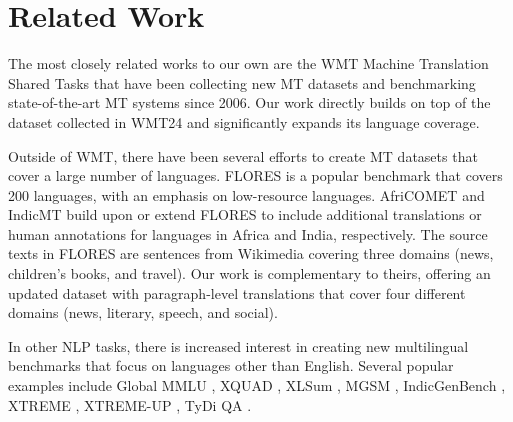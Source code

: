 \section{Related Work}
The most closely related works to our own are the WMT Machine Translation Shared Tasks \citep[][\emph{inter alia}]{kocmi-etal-2024-findings} that have been collecting new MT datasets and benchmarking state-of-the-art MT systems since 2006.
Our work directly builds on top of the dataset collected in WMT24 and significantly expands its language coverage.

Outside of WMT, there have been several efforts to create MT datasets that cover a large number of languages.
FLORES \citep{flores101,nllb2022} is a popular benchmark that covers 200 languages, with an emphasis on low-resource languages.
AfriCOMET \citep{wang-etal-2024-afrimte} and IndicMT \citep{sai-b-etal-2023-indicmt} build upon or extend FLORES to include additional translations or human annotations for languages in Africa and India, respectively.
The source texts in FLORES are sentences from Wikimedia covering three domains (news, children's books, and travel).
Our work is complementary to theirs, offering an updated dataset with paragraph-level translations that cover four different domains (news, literary, speech, and social). 

In other NLP tasks, there is increased interest in creating new multilingual benchmarks that focus on languages other than English.
Several popular examples include Global MMLU \citep{singh2024globalmmluunderstandingaddressing},
XQUAD \citep{Artetxe:etal:2019},
XLSum \citep{hasan2021xlsumlargescalemultilingualabstractive},
MGSM \citep{shi2022languagemodelsmultilingualchainofthought},
IndicGenBench \citep{singh-etal-2024-indicgenbench},
XTREME \citep{hu2020xtreme},
XTREME-UP \citep{ruder-etal-2023-xtreme},
TyDi QA \citep{clark-etal-2020-tydi}.